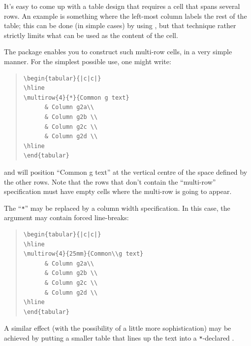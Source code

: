 
It's easy to come up with a table design that requires a cell that
spans several rows.  An example is something where the left-most
column labels the rest of the table; this can be done (in simple
cases) by using %
, but that
technique rather strictly limits what can be used as the content of
the cell.

The  package enables you to construct such multi-row
cells, in a very simple manner.  For the simplest possible use, one
might write:
\begin{quote}
\begin{verbatim}
\begin{tabular}{|c|c|}
\hline
\multirow{4}{*}{Common g text} 
      & Column g2a\\
      & Column g2b \\
      & Column g2c \\
      & Column g2d \\
\hline
\end{tabular}
\end{verbatim}
\end{quote}
and  will position ``Common g text'' at the vertical
centre of the space defined by the other rows.  Note that the rows
that don't contain the ``multi-row'' specification must have empty
cells where the multi-row is going to appear.

The ``\texttt{*}'' may be replaced by a column width specification.  In this
case, the argument may contain forced line-breaks:
\begin{quote}
\begin{verbatim}
\begin{tabular}{|c|c|}
\hline
\multirow{4}{25mm}{Common\\g text} 
      & Column g2a\\
      & Column g2b \\
      & Column g2c \\
      & Column g2d \\
\hline
\end{tabular}
\end{verbatim}
\end{quote}
A similar effect (with the possibility of a little more
sophistication) may be achieved by putting a smaller table that lines
up the text into a \texttt{*}-declared .

